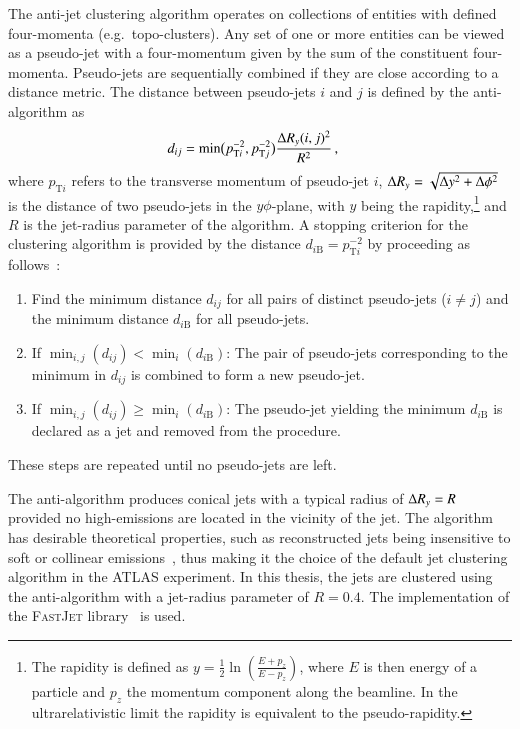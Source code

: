 The anti-\kt jet clustering algorithm operates on collections of entities with
defined four-momenta (e.g.\ topo-clusters). Any set of one or more entities can
be viewed as a pseudo-jet with a four-momentum given by the sum of the
constituent four-momenta. Pseudo-jets are sequentially combined if they are
close according to a distance metric. The distance between pseudo-jets $i$ and
$j$ is defined by the anti-\kt algorithm as~\cite{Cacciari:2008gp}
\begin{align*}
  d_{ij} &= \min\bigl( p_{\text{T}i}^{-2}, p_{\text{T}j}^{-2} \bigr)
           \frac{ \Delta R_y(i, j)^2 }{ R^2 } \,\text{,}
\end{align*}
where $p_{\text{T}i}$ refers to the transverse momentum of pseudo-jet $i$,
$\Delta R_y = \sqrt{\Delta y^2 + \Delta \phi^2}$ is the distance of two pseudo-jets in
the $y\phi$-plane, with $y$ being the rapidity,\footnote{The rapidity is defined
  as $y = \frac{1}{2} \ln \left( \frac{E + p_z}{E - p_z} \right)$, where $E$ is
  then energy of a particle and $p_z$ the momentum component along the
  beamline. In the ultrarelativistic limit the rapidity is equivalent to the
  pseudo-rapidity.} and $R$ is the jet-radius parameter of the algorithm. A
stopping criterion for the clustering algorithm is provided by the distance
$d_{i\text{B}} = p_{\text{T}i}^{-2}$ by proceeding as
follows~\cite{Cacciari:2008gp}:
\begin{enumerate}
\item Find the minimum distance $d_{ij}$ for all pairs of distinct pseudo-jets
  ($i \neq j$) and the minimum distance $d_{i\text{B}}$ for all pseudo-jets.

\item If $\min_{i,j}(d_{ij}) < \min_{i}(d_{i\text{B}})$: The pair of pseudo-jets
  corresponding to the minimum in $d_{ij}$ is combined to form a new pseudo-jet.

\item If $\min_{i,j}(d_{ij}) \geq \min_{i}(d_{i\text{B}})$: The pseudo-jet
  yielding the minimum $d_{i\text{B}}$ is declared as a jet and removed from the
  procedure.
\end{enumerate}
These steps are repeated until no pseudo-jets are left.

The anti-\kt algorithm produces conical jets with a typical radius of $\Delta R_y = R$
provided no high-\pT emissions are located in the vicinity of the jet. The
algorithm has desirable theoretical properties, such as reconstructed jets being
insensitive to soft or collinear emissions~\cite{Cacciari:2008gp}, thus making
it the choice of the default jet clustering algorithm in the ATLAS
experiment. In this thesis, the jets are clustered using the anti-\kt algorithm
with a jet-radius parameter of $R = 0.4$. The implementation of the
\textsc{FastJet} library~\cite{Fastjet} is used.


